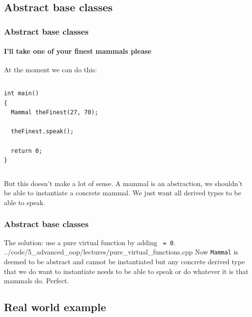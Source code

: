 \documentclass{beamer}
\begin{document}
\subsection{Abstract base classes}

\begin{frame}[fragile]
  \frametitle{Abstract base classes}
  \framesubtitle{I'll take one of  your finest mammals please}
  
  At the moment we can do this:
  \begin{columns}[t]
    \begin{column}[T]{0.48\linewidth}
  		\begin{lstlisting}[aboveskip=0pt]
int main()
{
  Mammal theFinest(27, 70);
  
  theFinest.speak();
  
  return 0;
}
			\end{lstlisting}
		\end{column}
		\begin{column}[T]{0.48\linewidth}
		\end{column}
	\end{columns}
	But this doesn't make a lot of sense.  A mammal is an abstraction, we shouldn't be able to instantiate a concrete mammal.  We just want all derived types to be able to speak.

\end{frame}

\begin{frame}[fragile]
  \frametitle{Abstract base classes}
  
  The solution: use a pure virtual function by adding \texttt{ = 0}.
  	{../code/5_advanced_oop/lectures/pure_virtual_functions.cpp}
  	\pause
  Now \texttt{Mammal} is deemed to be abstract and cannot be instantiated but any concrete derived type that we do want to instantiate needs to be able to speak or do whatever it is that mammals do. Perfect.

\end{frame}

\subsection{Real world example}
\end{document}

